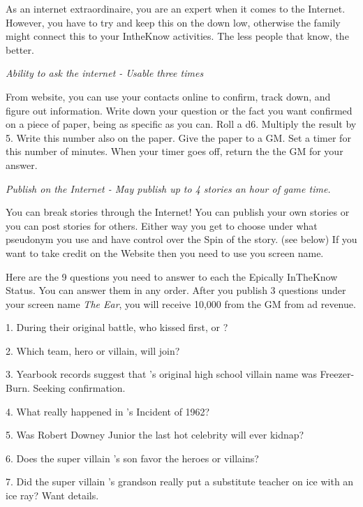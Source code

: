 \documentclass[green]{LRSguildcamp1}
\begin{document}
\name{\gInternetPR{}}

As an internet extraordinaire, you are an expert when it comes to the Internet. However, you have to try and keep this on the down low, otherwise the family might connect this to your IntheKnow activities. The less people that know, the better. 

\textit{Ability to ask the internet - Usable three times}

From \pTweenwebsite{} website, you can use your contacts online to confirm, track down, and figure out information. Write down your question or the fact you want confirmed on a piece of paper, being as specific as you can. Roll a d6. Multiply the result by 5. Write this number also on the paper. Give the paper to a GM. Set a timer for this number of minutes. When your timer goes off, return the the GM for your answer. 

\textit{Publish on the Internet - May publish up to 4 stories an hour of game time.}

You can break stories through the Internet! You can publish your own stories or you can post stories for others. Either way you get to choose under what pseudonym you use and have control over the Spin of the story. (see below) If you want to take credit on the \pTweenwebsite{} Website then you need to use you screen name.

Here are the 9 questions you need to answer to each the Epically InTheKnow Status. You can answer them in any order. After you publish 3 questions under your screen name \textit{The Ear}, you will receive 10,000 from the GM from ad revenue. 

1. During their original battle, who kissed first, \cOS{\MYsupername} or \cOldest{\MYsupername}?

2. Which team, hero or villain, will \cGrad{} join?

3. Yearbook records suggest that \cOldest{\MYsupername}'s original high school villain name was Freezer-Burn. Seeking confirmation. 

4. What really happened in \cGrandma{\MYsupername}'s Incident of 1962?

5. Was Robert Downey Junior the last hot celebrity  \cGrandma{\MYsupername} will ever kidnap?

6. Does the super villain \cGrandma{\MYsupername}'s son \cArchitect{} favor the heroes or villains?

7. Did the super villain \cGrandma{\MYsupername}'s grandson \cTeen{} really put a substitute teacher on ice with an ice ray? Want details. 
\end{document}

